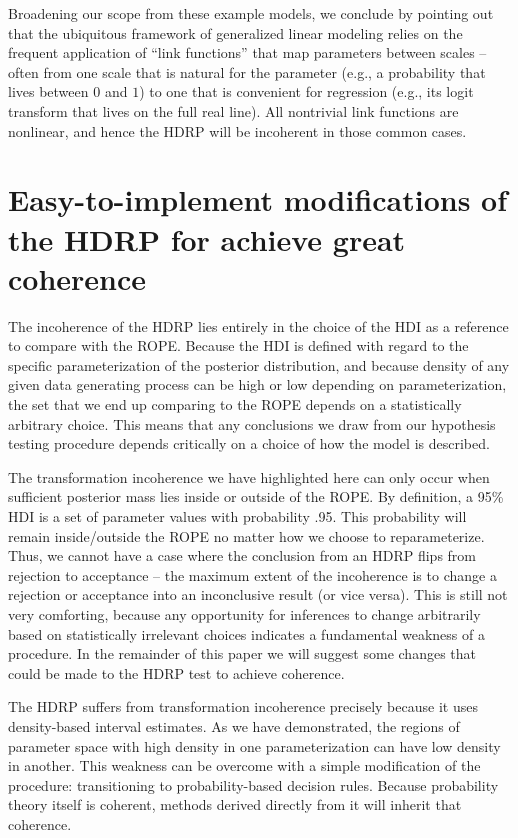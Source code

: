 \documentclass[man]{apa}
\newcommand{\hdr}{HDRP}
\begin{document}
Broadening our scope from these example models, we conclude by pointing out that the ubiquitous framework of generalized linear modeling relies on the frequent application of ``link functions'' that map parameters between scales -- often from one scale that is natural for the parameter (e.g., a probability that lives between $0$ and $1$) to one that is convenient for regression (e.g., its logit transform that lives on the full real line).  All nontrivial link functions are nonlinear, and hence the \hdr{} will be incoherent in those common cases.

\section*{Easy-to-implement modifications of the \hdr{} for achieve great coherence}

The incoherence of the \hdr{} lies entirely in the choice of the HDI as a reference to compare with the ROPE. Because the HDI is defined with regard to the specific parameterization of the posterior distribution, and because density of any given data generating process can be high or low depending on parameterization, the set that we end up comparing to the ROPE depends on a statistically arbitrary choice. This means that any conclusions we draw from our hypothesis testing procedure depends critically on a choice of how the model is described. 

The transformation incoherence we have highlighted here can only occur when sufficient posterior mass lies inside or outside of the ROPE. By definition, a 95\% HDI is a set of parameter values with probability .95. This probability will remain inside/outside the ROPE no matter how we choose to reparameterize. Thus, we cannot have a case where the conclusion from an \hdr{} flips from rejection to acceptance -- the maximum extent of the incoherence is to change a rejection or acceptance into an inconclusive result (or vice versa). This is still not very comforting, because any opportunity for inferences to change arbitrarily based on statistically irrelevant choices indicates a fundamental weakness of a procedure. In the remainder of this paper we will suggest some changes that could be made to the \hdr{} test to achieve coherence.

The \hdr{} suffers from transformation incoherence precisely because it uses density-based interval estimates. As we have demonstrated, the regions of parameter space with high density in one parameterization can have low density in another. This weakness can be overcome with a simple modification of the procedure: transitioning to probability-based decision rules. Because probability theory itself is coherent, methods derived directly from it will inherit that coherence. 
\end{document}
